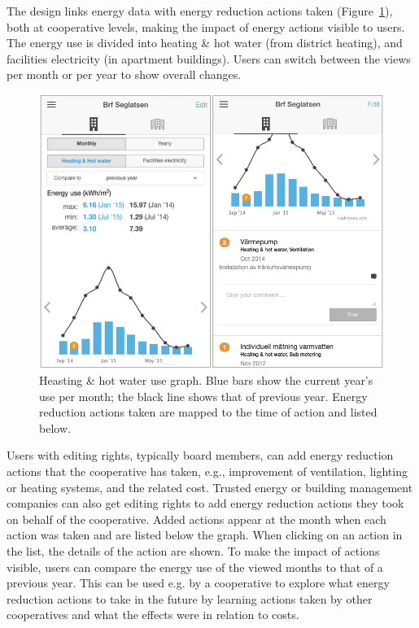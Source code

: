 The design links energy data with energy reduction actions taken (Figure~\ref{fig:Figure201_Actions}), both at cooperative levels, making the impact of energy actions visible to users. The energy use is divided into heating \& hot water (from district heating), and facilities electricity (in apartment buildings). Users can switch between the views per month or per year to show overall changes. %
%
\begin{figure}[h!]
	\centering
	\includegraphics[width=.9\linewidth]{img/Figure201_Actions.png}
	\caption{Heasting \& hot water use graph. Blue bars show the current year's use per month; the black line shows that of previous year. Energy reduction actions taken are mapped to the time of action and listed below.}
	\label{fig:Figure201_Actions}
\end{figure}
%
Users with editing rights, typically board members, can  add energy reduction actions that the cooperative has taken, e.g., improvement of ventilation, lighting or heating systems, 
and the related cost.
Trusted energy or building management companies can also get editing rights to add energy reduction actions they took on behalf of the cooperative. 
Added actions appear at the month when each action was taken and are listed below the graph. When clicking on an action in the list, the details of the action are shown.
% 
To make the impact of actions visible, users can compare the energy use of the viewed months to that of a previous year. This can be used e.g. by a cooperative to explore what energy reduction actions to take in the future by learning actions taken by other cooperatives and what the effects were in relation to costs.\\

